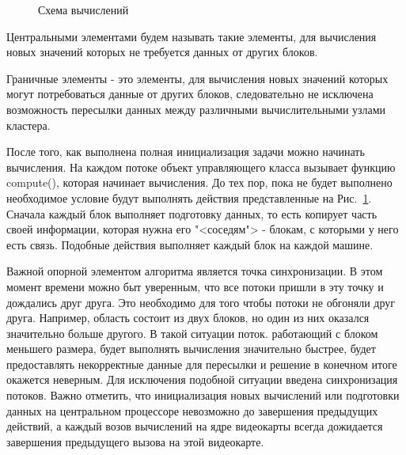 \documentclass[a4paper, 14pt]{extarticle}
\theoremstyle{definition}
\begin{document}
\begin{figure}[h]
	\caption{Схема вычислений}
	\label{ris:scheme}
\end{figure}

\par Центральными элементами будем называть такие элементы, для вычисления новых значений которых не требуется данных от других блоков.

\par Граничные элементы - это элементы, для вычисления новых значений которых могут потребоваться данные от других блоков, следовательно не исключена возможность пересылки данных между различными вычислительными узлами кластера.

\par После того, как выполнена полная инициализация задачи можно начинать вычисления. На каждом потоке объект управляющего класса вызывает функцию compute(), которая начинает вычисления. До тех пор, пока не будет выполнено необходимое условие будут выполнять действия представленные на Рис.~\ref{ris:scheme}. Сначала каждый блок выполняет подготовку данных, то есть копирует часть своей информации, которая нужна его  "<соседям"> - блокам, с которыми у него есть связь. Подобные действия выполняет каждый блок на каждой машине.

\par Важной опорной элементом алгоритма является точка синхронизации. В этом момент времени можно быт уверенным, что все потоки пришли в эту точку и дождались друг друга. Это необходимо для того чтобы потоки не обгоняли друг друга. Например, область состоит из двух блоков, но один из них оказался значительно больше другого. В такой ситуации поток. работающий с блоком меньшего размера, будет выполнять вычисления значительно быстрее, будет предоставлять некорректные данные для пересылки и решение в конечном итоге окажется неверным. Для исключения подобной ситуации введена синхронизация потоков. Важно отметить, что инициализация новых вычислений или подготовки данных на центральном процессоре невозможно до завершения предыдущих действий, а каждый возов вычислений на ядре видеокарты всегда дожидается завершения предыдущего вызова на этой видеокарте.
\end{document}
